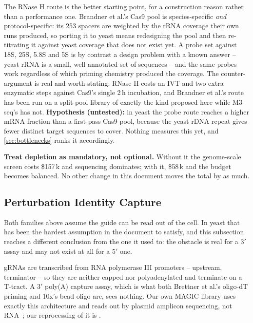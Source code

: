  The RNase H route is the better
starting point, for a construction reason rather than a performance one.
Brandner et al.'s Cas9 pool is species-specific \emph{and} protocol-specific: its
253 spacers are weighted by the rRNA coverage their own runs produced, so porting
it to yeast means redesigning the pool and then re-titrating it against yeast
coverage that does not exist yet. A probe set against 18S, 25S, 5.8S and 5S is by
contrast a design problem with a known answer -- yeast rRNA is a small, well
annotated set of sequences -- and the same probes work regardless of which
priming chemistry produced the coverage. The counter-argument is real and worth
stating: RNase H costs an IVT and two extra enzymatic steps against Cas9's single
2\,h incubation, and Brandner et al.'s route has been run on a split-pool library
of exactly the kind proposed here while M3-seq's has not. \textbf{Hypothesis
(untested):} in yeast the probe route reaches a higher mRNA fraction than a
first-pass Cas9 pool, because the yeast rDNA repeat gives fewer distinct target
sequences to cover. Nothing measures this yet, and \cref{sec:bottlenecks} ranks
it accordingly.

\begin{keybox}
\textbf{Treat depletion as mandatory, not optional.} Without it the genome-scale
screen costs \$157\,k and sequencing dominates; with it, \$58\,k and the budget
becomes balanced. No other change in this document moves the total by as much.
\end{keybox}

\subsection{Perturbation Identity Capture}
\label{sec:guide-capture}

Both families above assume the guide can be read out of the cell. In yeast that
has been the hardest assumption in the document to satisfy, and this subsection
reaches a different conclusion from the one it used to: the obstacle is real for
a 3$'$ assay and may not exist at all for a 5$'$ one.

gRNAs are transcribed from RNA polymerase III promoters -- 
upstream,  terminator -- so they are neither capped nor polyadenylated
and terminate on a T-tract. A 3$'$ poly(A) capture assay, which is what both
Brettner et al.'s oligo-dT priming and 10x's bead oligo are, sees nothing. Our own MAGIC
library uses exactly this architecture and reads out by plasmid amplicon
sequencing, not RNA~\citep{lianMultifunctionalGenomewideCRISPR2019}; our
reprocessing of it is .

